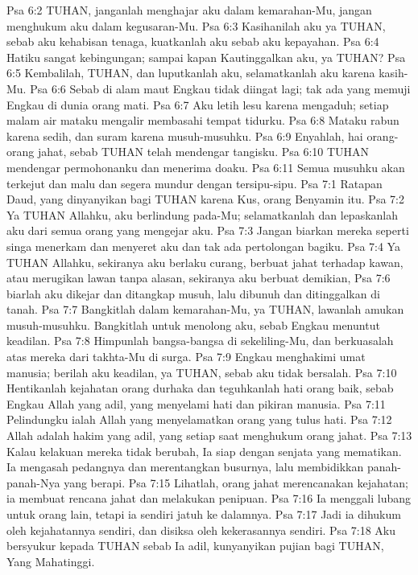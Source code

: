 Psa 6:2  TUHAN, janganlah menghajar aku dalam kemarahan-Mu, jangan menghukum aku dalam kegusaran-Mu.
Psa 6:3  Kasihanilah aku ya TUHAN, sebab aku kehabisan tenaga, kuatkanlah aku sebab aku kepayahan.
Psa 6:4  Hatiku sangat kebingungan; sampai kapan Kautinggalkan aku, ya TUHAN?
Psa 6:5  Kembalilah, TUHAN, dan luputkanlah aku, selamatkanlah aku karena kasih-Mu.
Psa 6:6  Sebab di alam maut Engkau tidak diingat lagi; tak ada yang memuji Engkau di dunia orang mati.
Psa 6:7  Aku letih lesu karena mengaduh; setiap malam air mataku mengalir membasahi tempat tidurku.
Psa 6:8  Mataku rabun karena sedih, dan suram karena musuh-musuhku.
Psa 6:9  Enyahlah, hai orang-orang jahat, sebab TUHAN telah mendengar tangisku.
Psa 6:10  TUHAN mendengar permohonanku dan menerima doaku.
Psa 6:11  Semua musuhku akan terkejut dan malu dan segera mundur dengan tersipu-sipu.
Psa 7:1  Ratapan Daud, yang dinyanyikan bagi TUHAN karena Kus, orang Benyamin itu.
Psa 7:2  Ya TUHAN Allahku, aku berlindung pada-Mu; selamatkanlah dan lepaskanlah aku dari semua orang yang mengejar aku.
Psa 7:3  Jangan biarkan mereka seperti singa menerkam dan menyeret aku dan tak ada pertolongan bagiku.
Psa 7:4  Ya TUHAN Allahku, sekiranya aku berlaku curang, berbuat jahat terhadap kawan, atau merugikan lawan tanpa alasan, sekiranya aku berbuat demikian,
Psa 7:6  biarlah aku dikejar dan ditangkap musuh, lalu dibunuh dan ditinggalkan di tanah.
Psa 7:7  Bangkitlah dalam kemarahan-Mu, ya TUHAN, lawanlah amukan musuh-musuhku. Bangkitlah untuk menolong aku, sebab Engkau menuntut keadilan.
Psa 7:8  Himpunlah bangsa-bangsa di sekeliling-Mu, dan berkuasalah atas mereka dari takhta-Mu di surga.
Psa 7:9  Engkau menghakimi umat manusia; berilah aku keadilan, ya TUHAN, sebab aku tidak bersalah.
Psa 7:10  Hentikanlah kejahatan orang durhaka dan teguhkanlah hati orang baik, sebab Engkau Allah yang adil, yang menyelami hati dan pikiran manusia.
Psa 7:11  Pelindungku ialah Allah yang menyelamatkan orang yang tulus hati.
Psa 7:12  Allah adalah hakim yang adil, yang setiap saat menghukum orang jahat.
Psa 7:13  Kalau kelakuan mereka tidak berubah, Ia siap dengan senjata yang mematikan. Ia mengasah pedangnya dan merentangkan busurnya, lalu membidikkan panah-panah-Nya yang berapi.
Psa 7:15  Lihatlah, orang jahat merencanakan kejahatan; ia membuat rencana jahat dan melakukan penipuan.
Psa 7:16  Ia menggali lubang untuk orang lain, tetapi ia sendiri jatuh ke dalamnya.
Psa 7:17  Jadi ia dihukum oleh kejahatannya sendiri, dan disiksa oleh kekerasannya sendiri.
Psa 7:18  Aku bersyukur kepada TUHAN sebab Ia adil, kunyanyikan pujian bagi TUHAN, Yang Mahatinggi.
